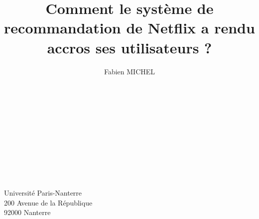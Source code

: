 \documentclass[12pt, a4paper, french, openright]{report}
\title{Comment le système de recommandation de Netflix a rendu
accros ses utilisateurs ?}
\author{Fabien MICHEL}
\begin{document}


\newpage
~
\thispagestyle{empty}
\newpage

\thispagestyle{empty}


\newpage

~
\thispagestyle{empty}
\newpage

\thispagestyle{empty}


\newpage
~
\thispagestyle{empty}
\newpage
~
\thispagestyle{empty}



\newpage
~
\thispagestyle{empty}


\tableofcontents
\thispagestyle{empty}
\setcounter{page}{0}

\newpage
~
\thispagestyle{empty}
\setcounter{page}{0}
\newpage




















\newpage
\printbibliography

\newpage
\listoffigures

\newpage
\thispagestyle{empty}
\vspace*{\fill}
\begin{center}
  Université Paris-Nanterre\\
  200 Avenue de la République\\
  92000 Nanterre
\end{center}
\vspace*{\fill}
\end{document}
